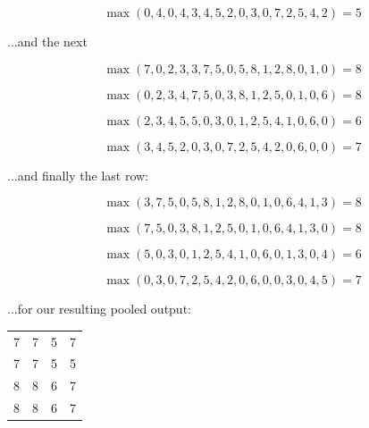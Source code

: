 \documentclass{article}
\begin{document}
\begin{equation}
    \max(0, 4, 0, 4, 3, 4, 5, 2, 0, 3, 0, 7, 2, 5, 4, 2) = 5
\end{equation}

\noindent ...and the next

\begin{equation}
    \max(7, 0, 2, 3, 3, 7, 5, 0, 5, 8, 1, 2, 8, 0, 1, 0) = 8
\end{equation}

\begin{equation}
    \max(0, 2, 3, 4, 7, 5, 0, 3, 8, 1, 2, 5, 0, 1, 0, 6) = 8
\end{equation}

\begin{equation}
    \max(2, 3, 4, 5, 5, 0, 3, 0, 1, 2, 5, 4, 1, 0, 6, 0) = 6
\end{equation}

\begin{equation}
    \max(3, 4, 5, 2, 0, 3, 0, 7, 2, 5, 4, 2, 0, 6, 0, 0) = 7
\end{equation}

\noindent ...and finally the last row:

\begin{equation}
    \max(3, 7, 5, 0, 5, 8, 1, 2, 8, 0, 1, 0, 6, 4, 1, 3) = 8
\end{equation}

\begin{equation}
    \max(7, 5, 0, 3, 8, 1, 2, 5, 0, 1, 0, 6, 4, 1, 3, 0) = 8
\end{equation}

\begin{equation}
    \max(5, 0, 3, 0, 1, 2, 5, 4, 1, 0, 6, 0, 1, 3, 0, 4) = 6
\end{equation}

\begin{equation}
    \max(0, 3, 0, 7, 2, 5, 4, 2, 0, 6, 0, 0, 3, 0, 4, 5) = 7
\end{equation}

\noindent ...for our resulting pooled output:

\begin{center}
    \begin{tabular}{c c c c}
        7 & 7 & 5 & 7 \\
        7 & 7 & 5 & 5 \\
        8 & 8 & 6 & 7 \\
        8 & 8 & 6 & 7 \\
    \end{tabular}
\end{center}
\end{document}
